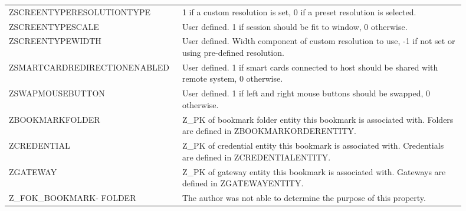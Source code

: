 \documentclass[journal]{IEEEtran}
\begin{document}
\begin{table}[h!]
\begin{tabular}{p{0.3\linewidth} | p{0.6\linewidth}}
ZSCREENTYPERESOLUTIONTYPE     & 1 if a custom resolution is set, 0 if a preset resolution is selected.                                                                                                                                                                                           \\
ZSCREENTYPESCALE              & User defined. 1 if session should be fit to window, 0 otherwise. \\
ZSCREENTYPEWIDTH              & User defined. Width component of custom resolution to use, -1 if not set or using pre-defined resolution.                                                                                                                                                                                           \\
ZSMARTCARDREDIRECTIONENABLED  & User defined. 1 if smart cards connected to host should be shared with remote system, 0 otherwise.                                                                                             \\
ZSWAPMOUSEBUTTON              & User defined. 1 if left and right mouse buttons should be swapped, 0 otherwise.                                                                                                                \\
ZBOOKMARKFOLDER               & Z\_PK of bookmark folder entity this bookmark is associated with. Folders are defined in ZBOOKMARKORDERENTITY.                                                                                 \\
ZCREDENTIAL                   & Z\_PK of credential entity this bookmark is associated with. Credentials are defined in ZCREDENTIALENTITY.                                                                                     \\
ZGATEWAY                      & Z\_PK of gateway entity this bookmark is associated with. Gateways are defined in ZGATEWAYENTITY.                                                                                              \\
Z\_FOK\_BOOKMARK- FOLDER        & The author was not able to determine the purpose of this property.                                                                                                                                                                                                                                                                                                                                                                                     \\

\end{tabular}
\end{table}
\end{document}
